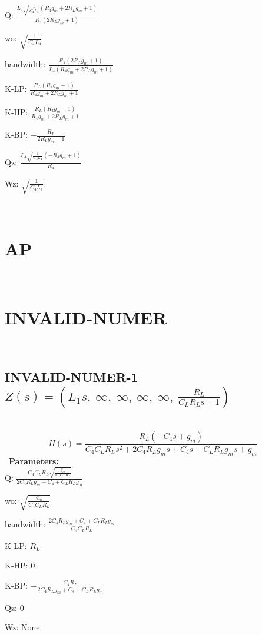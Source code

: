 \documentclass{article}
\begin{document}
Q: $\frac{L_{4} \sqrt{\frac{1}{C_{4} L_{4}}} \left(R_{4} g_{m} + 2 R_{L} g_{m} + 1\right)}{R_{4} \left(2 R_{L} g_{m} + 1\right)}$\ 

wo: $\sqrt{\frac{1}{C_{4} L_{4}}}$\ 

bandwidth: $\frac{R_{4} \left(2 R_{L} g_{m} + 1\right)}{L_{4} \left(R_{4} g_{m} + 2 R_{L} g_{m} + 1\right)}$\ 

K-LP: $\frac{R_{L} \left(R_{4} g_{m} - 1\right)}{R_{4} g_{m} + 2 R_{L} g_{m} + 1}$\ 

K-HP: $\frac{R_{L} \left(R_{4} g_{m} - 1\right)}{R_{4} g_{m} + 2 R_{L} g_{m} + 1}$\ 

K-BP: $- \frac{R_{L}}{2 R_{L} g_{m} + 1}$\ 

Qz: $\frac{L_{4} \sqrt{\frac{1}{C_{4} L_{4}}} \left(- R_{4} g_{m} + 1\right)}{R_{4}}$\ 

Wz: $\sqrt{\frac{1}{C_{4} L_{4}}}$\ 

\ 

\section{AP}\ 
\section{INVALID-NUMER}\ 
\subsection{INVALID-NUMER-1 $Z(s) = \left( L_{1} s, \  \infty, \  \infty, \  \infty, \  \infty, \  \frac{R_{L}}{C_{L} R_{L} s + 1}\right)$ } \ 
\textbf{\[H(s) = \frac{R_{L} \left(- C_{4} s + g_{m}\right)}{C_{4} C_{L} R_{L} s^{2} + 2 C_{4} R_{L} g_{m} s + C_{4} s + C_{L} R_{L} g_{m} s + g_{m}}\] } \ 
\textbf{Parameters:}\\ 

Q: $\frac{C_{4} C_{L} R_{L} \sqrt{\frac{g_{m}}{C_{4} C_{L} R_{L}}}}{2 C_{4} R_{L} g_{m} + C_{4} + C_{L} R_{L} g_{m}}$\ 

wo: $\sqrt{\frac{g_{m}}{C_{4} C_{L} R_{L}}}$\ 

bandwidth: $\frac{2 C_{4} R_{L} g_{m} + C_{4} + C_{L} R_{L} g_{m}}{C_{4} C_{L} R_{L}}$\ 

K-LP: $R_{L}$\ 

K-HP: $0$\ 

K-BP: $- \frac{C_{4} R_{L}}{2 C_{4} R_{L} g_{m} + C_{4} + C_{L} R_{L} g_{m}}$\ 

Qz: $0$\ 

Wz: $\text{None}$\ 
\end{document}
